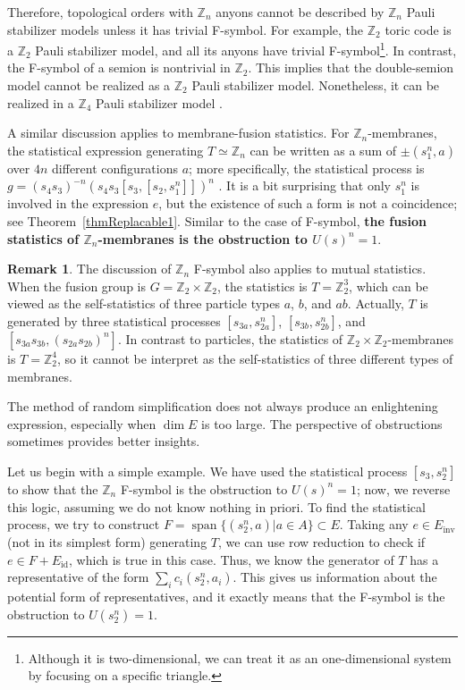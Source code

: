 \documentclass[reprint, amsmath, amssymb, showpacs, floatfix, longbibliography, aps, twocolumn, superscriptaddress, nofootinbib]{revtex4-2}
\newcommand{\ZZ}{{\mathbb Z}}
\theoremstyle{definition}
\newtheorem{remark}{Remark}[section]
\begin{document}
 Therefore, topological orders with $\mathbb{Z}_n$ anyons cannot be described by $\mathbb{Z}_n$ Pauli stabilizer models unless it has trivial F-symbol. For example, the $\mathbb{Z}_2$ toric code is a $\ZZ_2$ Pauli stabilizer model, and all its anyons have trivial F-symbol\footnote{Although it is two-dimensional, we can treat it as an one-dimensional system by focusing on a specific triangle.}. In contrast, the F-symbol of a semion is nontrivial in $\ZZ_2$. This implies that the double-semion model cannot be realized as a $\ZZ_2$ Pauli stabilizer model. Nonetheless, it can be realized in a $\mathbb{Z}_4$ Pauli stabilizer model \cite{Ellison_2022}.
 
 A similar discussion applies to membrane-fusion statistics. For $\ZZ_n$-membranes,  the statistical expression generating $T\simeq \ZZ_n$ can be written as a sum of $\pm (s_1^n, a)$ over $4n$ different configurations $a$; more specifically, the statistical process is $g = (s_4 s_3)^{-n} (s_4s_3 [ s_3, [s_2, s_1^n]])^n$ \cite{Previous}. It is a bit surprising that only $s_1^n$ is involved in the expression $e$, but the existence of such a form is not a coincidence; see Theorem~\ref{thmReplacable1}. Similar to the case of F-symbol, \textbf{the fusion statistics of $\ZZ_n$-membranes is the obstruction to $U(s)^n=1$}.
 
 \begin{remark}
 	The discussion of $\mathbb{Z}_n$ F-symbol also applies to mutual statistics. When the fusion group is $G=\ZZ_2\times \ZZ_2$, the statistics is $T=\ZZ_2^3$, which can be viewed as the self-statistics of three particle types $a$, $b$, and $ab$. Actually, $T$ is generated by three statistical processes $[s_{3a}, s_{2a}^n]$, $[s_{3b}, s_{2b}^n]$, and $[s_{3a}s_{3b}, (s_{2a}s_{2b})^n] $. In contrast to particles, the statistics of $\ZZ_2\times \ZZ_2$-membranes is $T=\ZZ_2^4$, so it cannot be interpret as the self-statistics of three different types of membranes.
 \end{remark}
 
The method of random simplification does not always produce an enlightening expression, especially when $\dim E$ is too large. The perspective of obstructions sometimes provides better insights.

Let us begin with a simple example. We have used the statistical process $[s_3,s_2^n]$ to show that the $\ZZ_n$ F-symbol is the obstruction to $U(s)^n = 1$; now, we reverse this logic, assuming we do not know nothing in priori. To find the statistical process, we try to construct $F = \operatorname{span}\{(s_2^n, a) | a \in A\} \subset E$. Taking any $e\in E_{\operatorname{inv}}$ (not in its simplest form) generating $T$, we can use row reduction to check if $e\in F + E_{\operatorname{id}}$, which is true in this case. Thus, we know the generator of $T$ has a representative of the form $\sum_i c_i (s_2^n, a_i)$. This gives us information about the potential form of representatives, and it exactly means that the F-symbol is the obstruction to $U(s_2^n)=1$. 
 
\end{document}
